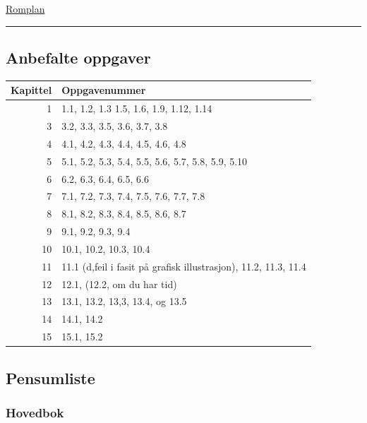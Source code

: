 \documentclass[
  letterpaper,
  DIV=11,
  numbers=noendperiod]{scrartcl}
\begin{document}
\href{https://tp.educloud.no/hiof/timeplan/timeplan.php?type=course&sem=24v&campus=&id\%5B\%5D=SFB10816\%2C1}{Romplan}

\begin{center}\rule{0.5\linewidth}{0.5pt}\end{center}

\subsection{Anbefalte oppgaver}\label{anbefalte-oppgaver}

\begin{table}
\centering
\fontsize{24}{26}\selectfont
\begin{tabular}[t]{r|l}
\hline
Kapittel & Oppgavenummer\\
\hline
1 & 1.1, 1.2, 1.3 1.5, 1.6, 1.9, 1.12, 1.14\\
\hline
3 & 3.2, 3.3, 3.5, 3.6, 3.7, 3.8\\
\hline
4 & 4.1, 4.2, 4.3, 4.4, 4.5, 4.6, 4.8\\
\hline
5 & 5.1, 5.2, 5.3, 5.4, 5.5, 5.6, 5.7, 5.8, 5.9, 5.10\\
\hline
6 & 6.2, 6.3, 6.4, 6.5, 6.6\\
\hline
7 & 7.1, 7.2, 7.3, 7.4, 7.5, 7.6, 7.7, 7.8\\
\hline
8 & 8.1, 8.2, 8.3, 8.4, 8.5, 8.6, 8.7\\
\hline
9 & 9.1, 9.2, 9.3, 9.4\\
\hline
10 & 10.1, 10.2, 10.3, 10.4\\
\hline
11 & 11.1 (d,feil i fasit på grafisk illustrasjon), 11.2, 11.3, 11.4\\
\hline
12 & 12.1, (12.2, om du har tid)\\
\hline
13 & 13.1, 13.2, 13,3, 13.4, og 13.5\\
\hline
14 & 14.1, 14.2\\
\hline
15 & 15.1, 15.2\\
\hline
\end{tabular}
\end{table}

\subsection{Pensumliste}\label{pensumliste}

\subsubsection{Hovedbok}\label{hovedbok}
\end{document}
